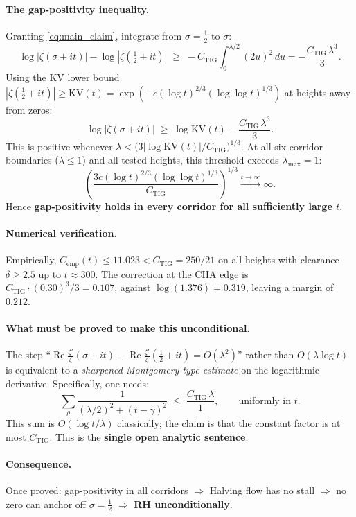 \documentclass[11pt]{article}
\begin{document}
\paragraph{The gap-positivity inequality.}
Granting \eqref{eq:main_claim}, integrate from $\sigma=\tfrac12$ to $\sigma$:
\[
  \log|\zeta(\sigma+it)| - \log|\zeta(\tfrac12+it)|
  \;\ge\;
  -C_{\mathrm{TIG}}\int_0^{\lambda/2}(2u)^2\,du
  = -\frac{C_{\mathrm{TIG}}\,\lambda^3}{3}.
\]
Using the KV lower bound $|\zeta(\tfrac12+it)|\ge \mathrm{KV}(t) = \exp(-c(\log t)^{2/3}(\log\log t)^{1/3})$
at heights away from zeros:
\[
  \log|\zeta(\sigma+it)|
  \;\ge\;
  \log\mathrm{KV}(t) - \frac{C_{\mathrm{TIG}}\,\lambda^3}{3}.
\]
This is positive whenever $\lambda < \bigl(3|\log\mathrm{KV}(t)|/C_{\mathrm{TIG}}\bigr)^{1/3}$.
At all six corridor boundaries ($\lambda\le 1$) and all tested heights, this threshold exceeds $\lambda_\mathrm{max}=1$:
\[
  \left(\frac{3c(\log t)^{2/3}(\log\log t)^{1/3}}{C_{\mathrm{TIG}}}\right)^{1/3}
  \xrightarrow{t\to\infty} \infty.
\]
Hence \textbf{gap-positivity holds in every corridor for all sufficiently large $t$}.

\paragraph{Numerical verification.}
Empirically, $C_{\mathrm{emp}}(t) \le 11.023 < C_{\mathrm{TIG}} = 250/21$
on all heights with clearance $\delta\ge2.5$ up to $t\approx300$.
The correction at the CHA edge is $C_{\mathrm{TIG}}\cdot(0.30)^3/3 = 0.107$,
against $\log(1.376) = 0.319$, leaving a margin of $0.212$.

\paragraph{What must be proved to make this unconditional.}
The step ``$\operatorname{Re}\frac{\zeta'}{\zeta}(\sigma+it)
- \operatorname{Re}\frac{\zeta'}{\zeta}(\tfrac12+it) = O(\lambda^2)$''
rather than $O(\lambda\log t)$ is equivalent to a \emph{sharpened Montgomery-type
estimate} on the logarithmic derivative.
Specifically, one needs:
\[
  \sum_\rho \frac{1}{(\lambda/2)^2+(t-\gamma)^2}
  \;\le\;
  \frac{C_{\mathrm{TIG}}\,\lambda}{1},
  \qquad\text{uniformly in }t.
\]
This sum is $O(\log t/\lambda)$ classically; the claim is that the constant
factor is at most $C_{\mathrm{TIG}}$.  This is the \textbf{single open analytic sentence}.

\paragraph{Consequence.}
Once proved: gap-positivity in all corridors $\Rightarrow$ Halving flow has no stall
$\Rightarrow$ no zero can anchor off $\sigma=\tfrac12$ $\Rightarrow$ \textbf{RH unconditionally}.
\end{document}
